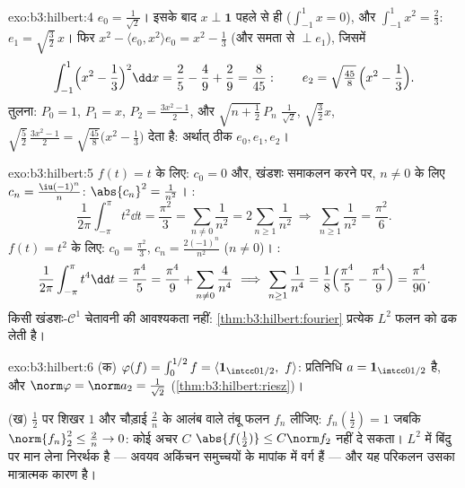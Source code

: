 \begin{solution}{exo:b3:hilbert:4}
$e_0 = \frac1{\sqrt2}$। इसके बाद $x \perp \mathbf 1$ पहले से ही ($\int_{-1}^1x = 0$), और $\int_{-1}^1x^2 = \frac23$: $e_1 =
\sqrt{\tfrac32}\,x$। फिर $x^2 - \langle e_0, x^2\rangle e_0 =
x^2 - \frac13$ (और
समता से $\perp e_1$), जिसमें
\[
\int_{-1}^1\Bigl(x^2 - \frac13\Bigr)^2\dd x = \frac25 -
\frac49 + \frac29 = \frac{8}{45}:
\qquad e_2 = \sqrt{\tfrac{45}8}\,\Bigl(x^2 - \frac13\Bigr).
\]
तुलना: $P_0 = 1$, $P_1 = x$, $P_2 = \frac{3x^2 - 1}2$, और $\sqrt{n + \tfrac12}\,P_n$ $\frac1{\sqrt2}$, $\sqrt{\frac32}x$, $\sqrt{\frac52}\,\frac{3x^2-1}2 =
\sqrt{\frac{45}8}\bigl(x^2 - \frac13\bigr)$ देता है: अर्थात्
ठीक $e_0, e_1,
e_2$।
\end{solution}

\begin{solution}{exo:b3:hilbert:5}
$f(t) = t$ के लिए: $c_0 = 0$ और, खंडशः समाकलन करने पर, $n \neq 0$ के लिए $c_n =
\frac{\iu(-1)^n}{n}$: $\abs{c_n}^2 =
\frac1{n^2}$।
:
\[
\frac1{2\pi}\int_{-\pi}^\pi t^2\dd t = \frac{\pi^2}3
= \sum_{n\neq0}\frac1{n^2} = 2\sum_{n\geq1}\frac1{n^2}
\ \Longrightarrow\ \sum_{n\geq1}\frac1{n^2} = \frac{\pi^2}6 .
\]
$f(t) = t^2$ के लिए: $c_0 = \frac{\pi^2}3$, $c_n =
\frac{2(-1)^n}{n^2}$ ($n \ne 0$)। :
\[
\frac1{2\pi}\int_{-\pi}^{\pi}t^4\dd t = \frac{\pi^4}5
= \frac{\pi^4}9 + \sum_{n\neq0}\frac4{n^4}
\ \Longrightarrow\
\sum_{n\geq1}\frac1{n^4} = \frac18\Bigl(\frac{\pi^4}5 -
\frac{\pi^4}9\Bigr) = \frac{\pi^4}{90} .
\]
किसी खंडशः-$\mathcal C^1$ चेतावनी की आवश्यकता नहीं: \cref{thm:b3:hilbert:fourier} प्रत्येक $L^2$ फलन को
ढक लेती है।
\end{solution}

\begin{solution}{exo:b3:hilbert:6}
(क) $\varphi(f) = \int_0^{1/2}f = \langle\mathbf
1_{\intcc0{1/2}},\ f\rangle$: प्रतिनिधि $a =
\mathbf 1_{\intcc0{1/2}}$ है, और $\norm\varphi = \norm a_2 =
\frac1{\sqrt2}$ (\cref{thm:b3:hilbert:riesz})।

(ख) $\frac12$ पर शिखर $1$ और चौड़ाई $\frac2n$ के आलंब वाले तंबू फलन $f_n$
लीजिए: $f_n(\tfrac12) = 1$ जबकि $\norm{f_n}_2^2 \leq \frac2n \to 0$: कोई अचर $C$ $\abs{f(\frac12)} \leq C\norm f_2$ नहीं दे सकता। $L^2$ में
बिंदु पर मान लेना निरर्थक है --- अवयव अकिंचन समुच्चयों के मापांक
में वर्ग हैं --- और यह परिकलन उसका मात्रात्मक कारण है।
\end{solution}

